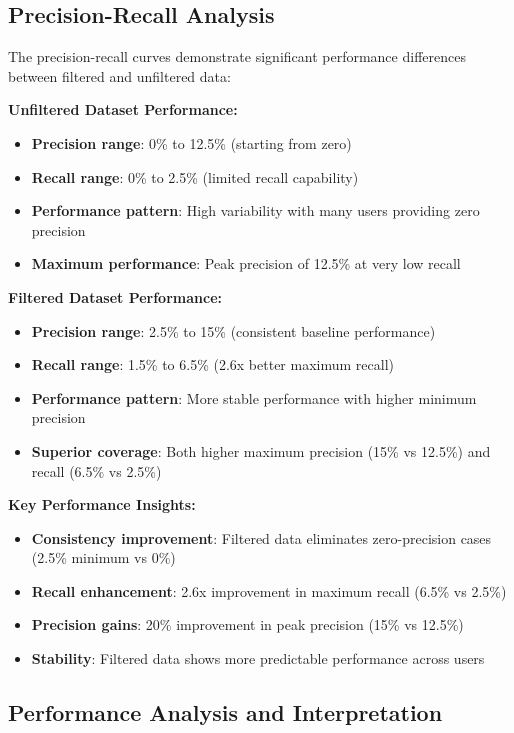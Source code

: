 \documentclass[12pt,a4paper]{article}
\begin{document}
\subsection{Precision-Recall Analysis}

The precision-recall curves demonstrate significant performance differences between filtered and unfiltered data:

\textbf{Unfiltered Dataset Performance:}
\begin{itemize}
    \item \textbf{Precision range}: 0\% to 12.5\% (starting from zero)
    \item \textbf{Recall range}: 0\% to 2.5\% (limited recall capability)
    \item \textbf{Performance pattern}: High variability with many users providing zero precision
    \item \textbf{Maximum performance}: Peak precision of 12.5\% at very low recall
\end{itemize}

\textbf{Filtered Dataset Performance:}
\begin{itemize}
    \item \textbf{Precision range}: 2.5\% to 15\% (consistent baseline performance)
    \item \textbf{Recall range}: 1.5\% to 6.5\% (2.6x better maximum recall)
    \item \textbf{Performance pattern}: More stable performance with higher minimum precision
    \item \textbf{Superior coverage}: Both higher maximum precision (15\% vs 12.5\%) and recall (6.5\% vs 2.5\%)
\end{itemize}

\textbf{Key Performance Insights:}
\begin{itemize}
    \item \textbf{Consistency improvement}: Filtered data eliminates zero-precision cases (2.5\% minimum vs 0\%)
    \item \textbf{Recall enhancement}: 2.6x improvement in maximum recall (6.5\% vs 2.5\%)
    \item \textbf{Precision gains}: 20\% improvement in peak precision (15\% vs 12.5\%)
    \item \textbf{Stability}: Filtered data shows more predictable performance across users
\end{itemize}

\subsection{Performance Analysis and Interpretation}
\end{document}
